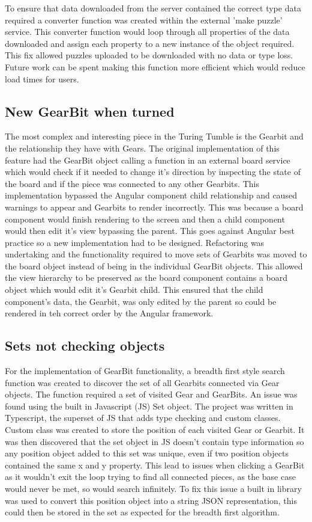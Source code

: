 \documentclass{l4proj}
\begin{document}
To ensure that data downloaded from the server contained the correct type data required a converter function was created within the external 'make puzzle' service. This converter function would loop through all properties of the data downloaded and assign each property to a new instance of the object required. This fix allowed puzzles uploaded to be downloaded with no data or type loss. Future work can be spent making this function more efficient which would reduce load times for users.

\subsection{New GearBit when turned}
The most complex and interesting piece in the Turing Tumble is the Gearbit and the relationship they have with Gears. The original implementation of this feature had the GearBit object calling a function in an external board service which would check if it needed to change it's direction by inspecting the state of the board and if the piece was connected to any other Gearbits. This implementation bypassed the Angular component child relationship and caused warnings to appear and Gearbits to render incorrectly. This was because a board component would finish rendering to the screen and then a child component would then edit it's view bypassing the parent. This goes against Angular best practice so a new implementation had to be designed. Refactoring was undertaking and the functionality required to move sets of Gearbits was moved to the board object instead of being in the individual GearBit objects. This allowed the view hierarchy to be preserved as the board component contains a board object which would edit it's Gearbit child. This ensured that the child component's data, the Gearbit, was only edited by the parent so could be rendered in teh correct order by the Angular framework. 

\subsection{Sets not checking objects}
For the implementation of GearBit functionality, a breadth first style search function was created to discover the set of all Gearbits connected via Gear objects. The function required a set of visited Gear and GearBits. An issue was found using the built in Javascript (JS) Set object. The project was written in Typescript, the superset of JS that adds type checking and custom classes. Custom class was created to store the position of each visited Gear or Gearbit. It was then discovered that the set object in JS doesn't contain type information so any position object added to this set was unique, even if two position objects contained the same x and y property. This lead to issues when clicking a GearBit as it wouldn't exit the loop trying to find all connected pieces, as the base case would never be met, so would search infinitely.  To fix this issue a built in library was used to convert this position object into a string JSON representation, this could then be stored in the set as expected for the breadth first algorithm. 
\end{document}
